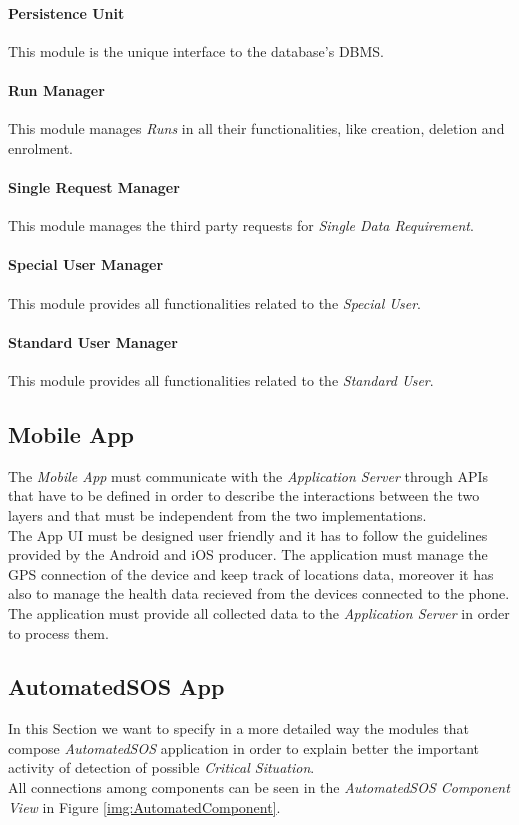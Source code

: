 \paragraph{Persistence Unit}
This module is the unique interface to the database's DBMS.

\paragraph{Run Manager}
This module manages \textit{Runs} in all their functionalities, like creation, deletion and enrolment.

\paragraph{Single Request Manager}
This module manages the third party requests for \textit{Single Data Requirement}.

\paragraph{Special User Manager}
This module provides all functionalities related to the \textit{Special User}.

\paragraph{Standard User Manager}
This module provides all functionalities related to the \textit{Standard User}.


\subsection{Mobile App}
The \textit{Mobile App} must communicate with the \textit{Application Server} through APIs that have to be defined in order to describe the interactions between the two layers and that must be independent from the two implementations.\\
The App UI must be designed user friendly and it has to follow the guidelines provided by the Android and iOS producer.
The application must manage the GPS connection of the device and keep track of locations data, moreover it has also to manage the health data recieved from the devices connected to the phone.\\
The application must provide all collected data to the \textit{Application Server} in order to process them.

\subsection{AutomatedSOS App}
In this Section we want to specify in a more detailed way the modules that compose \textit{AutomatedSOS} application in order to explain better the important activity of detection of possible \textit{Critical Situation}.\\
All connections among components can be seen in the \textit{AutomatedSOS Component View} in Figure \ref{img:AutomatedComponent}.

